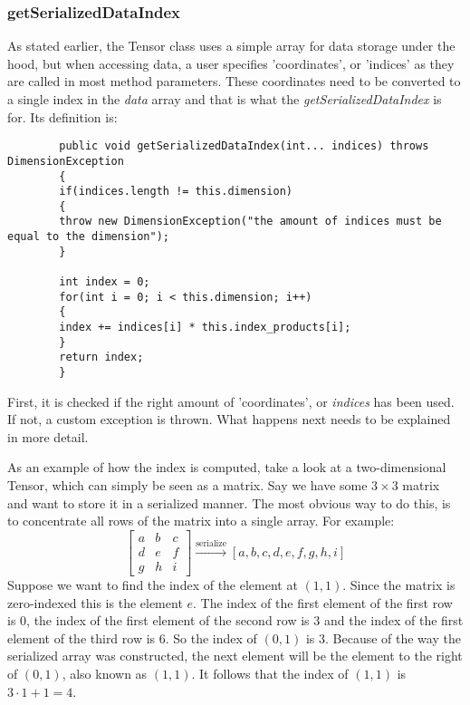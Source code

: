 \documentclass[12pt, titlepage]{article}
\begin{document}
		\subsubsection{getSerializedDataIndex}
		As stated earlier, the Tensor class uses a simple array for data storage under the hood, but when accessing data, a user specifies 'coordinates', or 'indices' as they are called in most method parameters. These coordinates need to be converted to a single index in the \textit{data} array and that is what the \textit{getSerializedDataIndex} is for. Its definition is:
		\begin{lstlisting}
		public void getSerializedDataIndex(int... indices) throws DimensionException
		{
		if(indices.length != this.dimension)
		{
		throw new DimensionException("the amount of indices must be equal to the dimension");
		}
		
		int index = 0;
		for(int i = 0; i < this.dimension; i++)
		{
		index += indices[i] * this.index_products[i];
		}
		return index;
		}
		\end{lstlisting}
		First, it is checked if the right amount of 'coordinates', or \textit{indices} has been used. If not, a custom exception is thrown. What happens next needs to be explained in more detail.
		
		As an example of how the index is computed, take a look at a two-dimensional Tensor, which can simply be seen as a matrix. Say we have some $3\times 3$ matrix and want to store it in a serialized manner. The most obvious way to do this, is to concentrate all rows of the matrix into a single array. For example:
		\begin{equation*}
		\begin{bmatrix}
		a &b &c\\
		d &e &f\\
		g &h &i
		\end{bmatrix}\stackrel{\text{serialize}}{\longrightarrow} [a,b,c,d,e,f,g,h,i]
		\end{equation*}
		Suppose we want to find the index of the element at $(1,1)$. Since the matrix is zero-indexed this is the element $e$. The index of the first element of the first row is $0$, the index of the first element of the second row is $3$ and the index of the first element of the third row is $6$. So the index of $(0,1)$ is $3$. Because of the way the serialized array was constructed, the next element will be the element to the right of $(0,1)$, also known as $(1,1)$. It follows that the index of $(1,1)$ is $3\cdot 1 + 1 = 4$.
		
\end{document}

